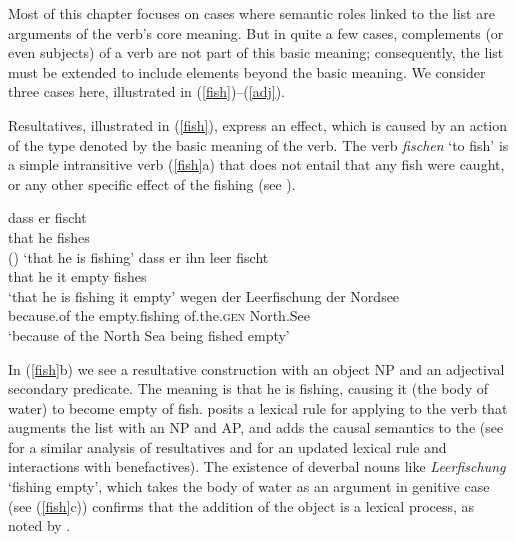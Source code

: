 \documentclass[output=paper
 	        ,biblatex
                ,babelshorthands
                ,newtxmath
                ,draftmode
                ,colorlinks, citecolor=brown
]{langscibook}
\begin{document}
%
Most of this chapter focuses on cases where semantic roles linked to the \argst list are arguments
of the verb's core meaning. But in quite a few cases, complements (or even subjects) of a verb are
not part of this basic meaning; consequently, the \argst list must be extended to include elements
beyond the basic meaning. We consider three cases here, illustrated in (\ref{fish})--(\ref{adj}).

Resultatives, illustrated in (\ref{fish}), express an effect, which is caused by an
action of the type denoted by the basic meaning of the verb. The verb \textit{fischen} `to fish' is
a simple intransitive verb (\ref{fish}a) that does not entail that any fish were caught, or any
other specific effect of the fishing (see \citealt[219--220]{Mueller2002b}).  

\begin{exe}
\ex\label{fish}
\begin{xlist}
\ex
\gll dass er  fischt\\
     that he  fishes\\\hfill()
\glt `that he is fishing'
\ex 
\gll dass er ihn leer fischt\\
     that he it empty fishes\\
\glt `that he is fishing it empty'
\ex 
\gll wegen der Leerfischung der Nordsee\footnotemark\\
     because.of the empty.fishing of.the.\textsc{gen} North.See \\
\glt `because of the North Sea being fished empty'
\end{xlist}
\end{exe}

\noindent
 In (\ref{fish}b) we see a resultative construction with an object NP and an adjectival secondary predicate.
 The meaning is that he is fishing, causing it (the body of water) to become empty of fish.  \citet[241]{Mueller2002b} posits a lexical rule for  applying to the verb that augments the \argst list with an NP and AP, and adds the causal semantics to the \content (see \citealt{Wechsler2005result} for a similar analysis of  resultatives and \citealt[Section~7.2.3]{MuellerLFGphrasal} for an updated lexical rule and interactions with benefactives).     The existence of deverbal nouns like \textit{Leerfischung} `fishing empty', which takes the body of water as an argument in genitive case (see (\ref{fish}c)) confirms that the addition of the object is a lexical process, as noted by \citet{Mueller2002b}.  
\end{document}
